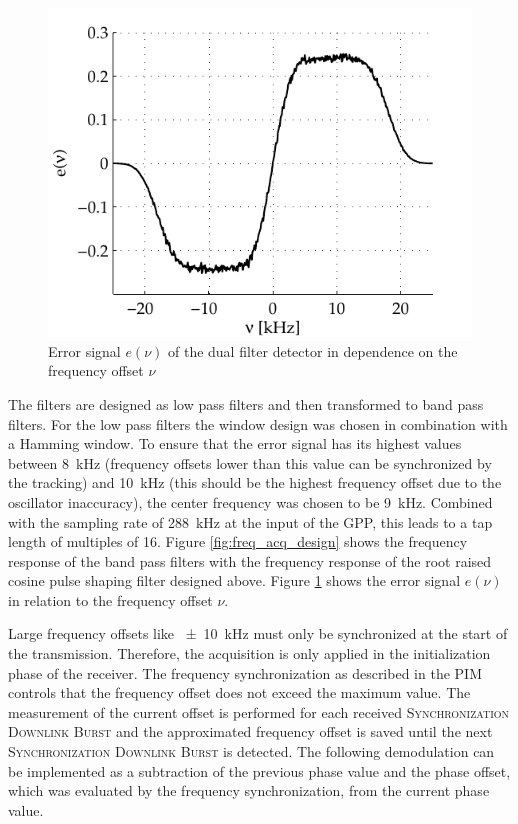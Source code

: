\begin{figure}[!htb]
	\centering
		\includegraphics{../kapitel04/figures/freq_acq_error.pdf}
	\caption{Error signal $e(\nu)$ of the dual filter detector in dependence on the frequency offset $\nu$}
	\label{fig:freq_acq_error}
\end{figure}

The filters are designed as low pass filters and then transformed to band pass filters. For the low pass filters the window design was chosen in combination with a Hamming window. To ensure that the error signal has its highest values between \SI{8}{kHz} (frequency offsets lower than this value can be synchronized by the tracking) and \SI{10}{kHz} (this should be the highest frequency offset due to the oscillator inaccuracy), the center frequency was chosen to be \SI{9}{kHz}. Combined with the sampling rate of \SI{288}{kHz} at the input of the GPP, this leads to a tap length of multiples of 16. Figure \ref{fig:freq_acq_design} shows the frequency response of the band pass filters with the frequency response of the root raised cosine pulse shaping filter designed above. Figure \ref{fig:freq_acq_error} shows the error signal $e(\nu)$ in relation to the frequency offset $\nu$. 


Large frequency offsets like \SI{\pm 10}{kHz} must only be synchronized at the start of the transmission. Therefore, the acquisition is only applied in the initialization phase of the receiver. The frequency synchronization as described in the \ac{PIM} controls that the frequency offset does not exceed the maximum value. The measurement of the current offset is performed for each received \textsc{Synchronization Downlink Burst} and the approximated frequency offset is saved until the next \textsc{Synchronization Downlink Burst} is detected. The following demodulation can be implemented as a subtraction of the previous phase value and the phase offset, which was evaluated by the frequency synchronization, from the current phase value.

